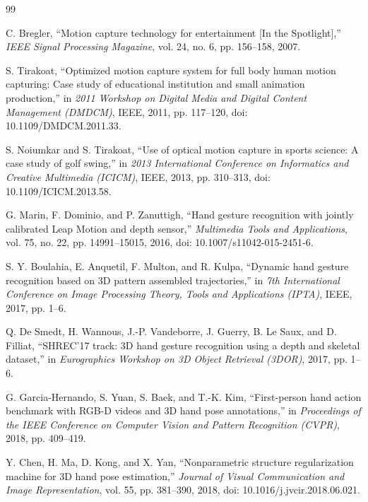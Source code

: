 \documentclass[10pt,twocolumn]{article}
\begin{document}
\begin{thebibliography}{99}
\footnotesize

C. Bregler, ``Motion capture technology for entertainment [In the Spotlight],'' \textit{IEEE Signal Processing Magazine}, vol. 24, no. 6, pp. 156--158, 2007.

S. Tirakoat, ``Optimized motion capture system for full body human motion capturing: Case study of educational institution and small animation production,'' in \textit{2011 Workshop on Digital Media and Digital Content Management (DMDCM)}, IEEE, 2011, pp. 117--120, doi: 10.1109/DMDCM.2011.33.

S. Noiumkar and S. Tirakoat, ``Use of optical motion capture in sports science: A case study of golf swing,'' in \textit{2013 International Conference on Informatics and Creative Multimedia (ICICM)}, IEEE, 2013, pp. 310--313, doi: 10.1109/ICICM.2013.58.

G. Marin, F. Dominio, and P. Zanuttigh, ``Hand gesture recognition with jointly calibrated Leap Motion and depth sensor,'' \textit{Multimedia Tools and Applications}, vol. 75, no. 22, pp. 14991--15015, 2016, doi: 10.1007/s11042-015-2451-6.

S. Y. Boulahia, E. Anquetil, F. Multon, and R. Kulpa, ``Dynamic hand gesture recognition based on 3D pattern assembled trajectories,'' in \textit{7th International Conference on Image Processing Theory, Tools and Applications (IPTA)}, IEEE, 2017, pp. 1--6.

Q. De Smedt, H. Wannous, J.-P. Vandeborre, J. Guerry, B. Le Saux, and D. Filliat, ``SHREC'17 track: 3D hand gesture recognition using a depth and skeletal dataset,'' in \textit{Eurographics Workshop on 3D Object Retrieval (3DOR)}, 2017, pp. 1--6.

G. Garcia-Hernando, S. Yuan, S. Baek, and T.-K. Kim, ``First-person hand action benchmark with RGB-D videos and 3D hand pose annotations,'' in \textit{Proceedings of the IEEE Conference on Computer Vision and Pattern Recognition (CVPR)}, 2018, pp. 409--419.

Y. Chen, H. Ma, D. Kong, and X. Yan, ``Nonparametric structure regularization machine for 3D hand pose estimation,'' \textit{Journal of Visual Communication and Image Representation}, vol. 55, pp. 381--390, 2018, doi: 10.1016/j.jvcir.2018.06.021.


\end{thebibliography}
\end{document}
